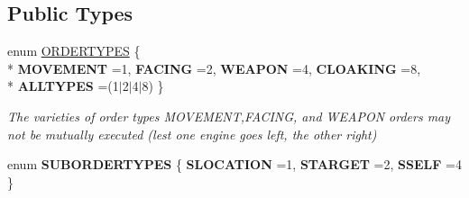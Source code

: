 \subsection*{Public Types}
\begin{DoxyCompactItemize}
\item 
enum \hyperlink{classOrder_a80a61490751da4a4bf90ac2e6c8f4fde}{O\+R\+D\+E\+R\+T\+Y\+P\+ES} \{ \\*
{\bfseries M\+O\+V\+E\+M\+E\+NT} =1, 
{\bfseries F\+A\+C\+I\+NG} =2, 
{\bfseries W\+E\+A\+P\+ON} =4, 
{\bfseries C\+L\+O\+A\+K\+I\+NG} =8, 
\\*
{\bfseries A\+L\+L\+T\+Y\+P\+ES} =(1$\vert$2$\vert$4$\vert$8)
 \}\hypertarget{classOrder_a80a61490751da4a4bf90ac2e6c8f4fde}{}\label{classOrder_a80a61490751da4a4bf90ac2e6c8f4fde}
\begin{DoxyCompactList}\small\item\em The varieties of order types M\+O\+V\+E\+M\+E\+NT,F\+A\+C\+I\+NG, and W\+E\+A\+P\+ON orders may not be mutually executed (lest one engine goes left, the other right) \end{DoxyCompactList}
\item 
enum {\bfseries S\+U\+B\+O\+R\+D\+E\+R\+T\+Y\+P\+ES} \{ {\bfseries S\+L\+O\+C\+A\+T\+I\+ON} =1, 
{\bfseries S\+T\+A\+R\+G\+ET} =2, 
{\bfseries S\+S\+E\+LF} =4
 \}\hypertarget{classOrder_aff553248af119551df442907bd95cfa0}{}\label{classOrder_aff553248af119551df442907bd95cfa0}

\end{DoxyCompactItemize}
